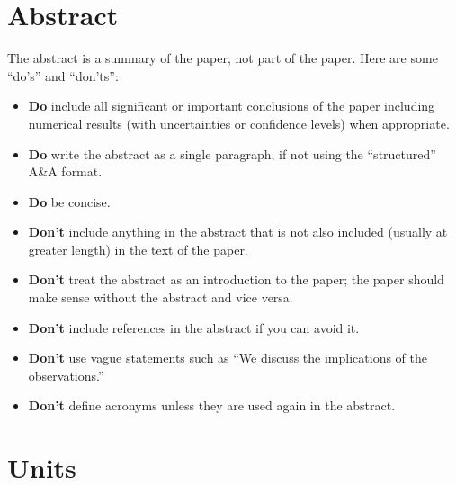 \documentclass[letterpaper,11pt]{article}
\begin{document}
\section{Abstract}

The abstract is a summary of the paper, not part of the paper. Here are some ``do's'' and ``don'ts'': 
\begin{itemize}
\item {\bf Do} include all significant or important conclusions of the paper including numerical results (with uncertainties or confidence levels) when appropriate.
\item {\bf Do} write the abstract as a single paragraph, if not using the ``structured'' A\&A format.  
\item {\bf Do} be concise.
\item {\bf Don't} include anything in the abstract that is not also included (usually at greater length) in the text of the paper.
\item {\bf Don't} treat the abstract as an introduction to the paper; the paper should make sense without the abstract and vice versa.
\item {\bf Don't} include references in the abstract if you can avoid it.
\item {\bf Don't} use vague statements such as ``We discuss the implications of the observations.''
\item {\bf Don't} define acronyms unless they are used again in the abstract. 
\end{itemize}






\section{Units}
\end{document}
